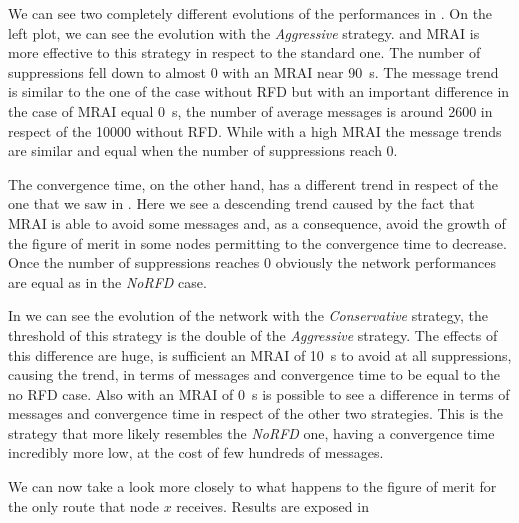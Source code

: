 We can see two completely different evolutions of the performances in .
On the left plot, we can see the evolution with the \textit{Aggressive} strategy.
and \ac{MRAI} is more effective to this strategy in respect to the standard one.
The number of suppressions fell down to almost \num{0} with an \ac{MRAI} near 
\SI{90}{\second}.
The message trend is similar to the one of the case without \ac{RFD} but with an
important difference in the case of  \ac{MRAI} equal \SI{0}{\second}, the number
of average messages is around \num{2600} in respect of the \num{10000} without
\ac{RFD}.
While with a high \ac{MRAI} the message trends are similar and equal when the number of
suppressions reach \num{0}.

The convergence time, on the other hand, has a different trend in respect of 
the one that we saw in .
Here we see a descending trend caused by the fact that \ac{MRAI} is able to avoid
some messages and, as a consequence, avoid the growth of the figure of merit in 
some nodes permitting to the convergence time to decrease.
Once the number of suppressions reaches \num{0} obviously the network performances
are equal as in the \textit{NoRFD} case.

In  we can see the evolution of the network with the 
\textit{Conservative} strategy, the threshold of this strategy is the double of
the \textit{Aggressive} strategy.
The effects of this difference are huge, is sufficient an \ac{MRAI} of \SI{10}{\second}
to avoid at all suppressions, causing the trend, in terms of messages and
convergence time to be equal to the no \ac{RFD} case.
Also with an \ac{MRAI} of \SI{0}{\second} is possible to see a difference in 
terms of messages and convergence time in respect of the other two strategies.
This is the strategy that more likely resembles the \textit{NoRFD} one,
having a convergence time incredibly more low, at the cost of few hundreds of messages.

We can now take a look more closely to what happens to the figure of merit 
for the only route that node $x$ receives.
Results are exposed in 

